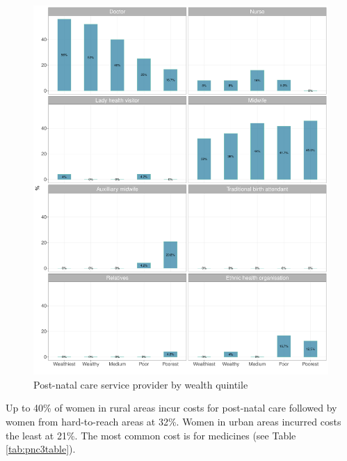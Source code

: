 \documentclass[12pt,a4paper]{article}
\begin{document}
\begin{figure}[H]

{\centering \includegraphics{kayahReport_files/figure-latex/pnc4Plot-1} 

}

\caption{Post-natal care service provider by wealth quintile}\label{fig:pnc4Plot}
\end{figure}

\newpage

Up to 40\% of women in rural areas incur costs for post-natal care followed by women from hard-to-reach areas at 32\%. Women in urban areas incurred costs the least at 21\%. The most common cost is for medicines (see Table \ref{tab:pnc3table}).
\end{document}
